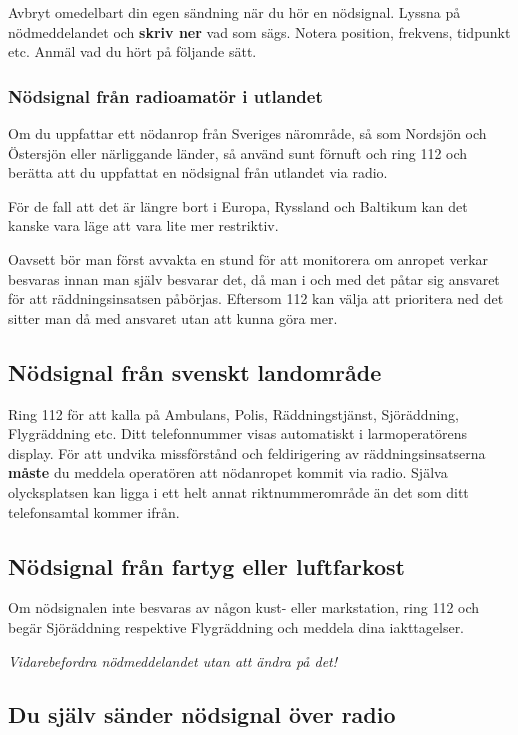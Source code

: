 Avbryt omedelbart din egen sändning när du hör en nödsignal. Lyssna på
nödmeddelandet och \textbf{skriv ner} vad som sägs. Notera position, frekvens, tidpunkt
etc. Anmäl vad du hört på följande sätt.

\subsubsection{Nödsignal från radioamatör i utlandet}

Om du uppfattar ett nödanrop från Sveriges närområde, så som Nordsjön och
Östersjön eller närliggande länder, så använd sunt förnuft och ring 112 och
berätta att du uppfattat en nödsignal från utlandet via radio.

För de fall att det är längre bort i Europa, Ryssland och Baltikum kan det
kanske vara läge att vara lite mer restriktiv.

Oavsett bör man först avvakta en stund för att monitorera om anropet verkar
besvaras innan man själv besvarar det, då man i och med det påtar sig ansvaret
för att räddningsinsatsen påbörjas. Eftersom 112 kan välja att prioritera ned
det sitter man då med ansvaret utan att kunna göra mer.

\subsection{Nödsignal från svenskt landområde}

Ring 112 för att kalla på Ambulans, Polis, Räddningstjänst, Sjöräddning,
Flygräddning etc.
Ditt telefonnummer visas automatiskt i larmoperatörens display.
För att undvika missförstånd och feldirigering av räddningsinsatserna
\textbf{måste} du meddela operatören att nödanropet kommit via radio.
Själva olycksplatsen kan ligga i ett helt annat riktnummerområde än det som ditt
telefonsamtal kommer ifrån.

\subsection{Nödsignal från fartyg eller luftfarkost}

Om nödsignalen inte besvaras av någon kust- eller markstation, ring 112
och begär Sjöräddning respektive Flygräddning och meddela dina iakttagelser.

\emph{Vidarebefordra nödmeddelandet utan att ändra på det!}

\subsection{Du själv sänder nödsignal över radio}

